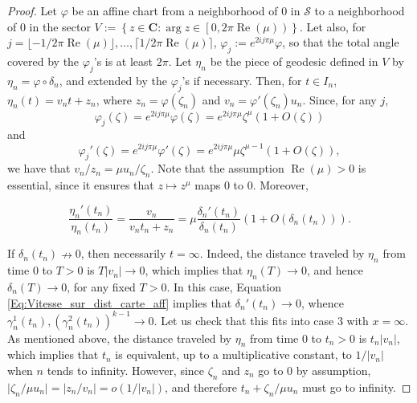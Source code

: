 \documentclass[11pt]{article}
\begin{document}
\begin{proof}
Let $\varphi$ be an affine chart from a neighborhood of $0$ in $\mathcal{S}$ to a neighborhood of $0$ in the sector $V:=\left\{z\in\mathbf{C}:\arg z\in\left[0,2\pi\operatorname{Re}(\mu)\right)\right\}$. Let also, for $j=\lfloor-1/2\pi\operatorname{Re}(\mu)\rfloor,\ldots,\lceil1/2\pi\operatorname{Re}(\mu)\rceil$, $\varphi_{j}:=e^{2ij\pi\mu}\varphi$, so that the total angle covered by the $\varphi_{j}$'s is at least $2\pi$. Let $\eta_{n}$ be the piece of geodesic defined in $V$ by $\eta_{n}=\varphi\circ\delta_{n}$, and extended by the $\varphi_{j}$'s if necessary. Then, for $t\in I_{n}$, $\eta_{n}(t)=v_{n}t+z_{n}$, where $z_{n}=\varphi(\zeta_{n})$ and $v_{n}=\varphi'(\zeta_{n})u_{n}$. Since, for any $j$,
\[
\varphi_{j}(\zeta)=e^{2ij\pi\mu}\varphi(\zeta)=e^{2ij\pi\mu}\zeta^{\mu}(1+O(\zeta))
\]
and
\[
\varphi_{j}'(\zeta)=e^{2ij\pi\mu}\varphi'(\zeta)=e^{2ij\pi\mu}\mu\zeta^{\mu-1}(1+O(\zeta)),
\]
we have that $v_{n}/z_{n}=\mu u_{n}/\zeta_{n}$. Note that the assumption $\operatorname{Re}(\mu)>0$ is essential, since it ensures that $z\mapsto z^{\mu}$ maps 0 to 0. Moreover,

\begin{equation}
    \label{Eq:Vitesse_sur_dist_carte_aff}
    \frac{\eta_{n}'(t_{n})}{\eta_{n}(t_{n})}=\frac{v_{n}}{v_{n}t_{n}+z_{n}}=\mu\frac{\delta_{n}'(t_{n})}{\delta_{n}(t_{n})}(1+O(\delta_{n}(t_{n}))).
\end{equation}

If $\delta_{n}(t_{n})\nrightarrow0$, then necessarily $t=\infty$. Indeed, the distance traveled by $\eta_{n}$ from time 0 to $T>0$ is $T\lvert v_{n}\rvert\rightarrow0$, which implies that $\eta_{n}(T)\rightarrow0$, and hence $\delta_{n}(T)\rightarrow0$, for any fixed $T>0$. In this case, Equation \ref{Eq:Vitesse_sur_dist_carte_aff} implies that $\delta_{n}'(t_{n})\rightarrow0$, whence $\gamma_{n}^{1}(t_{n}),\left(\gamma_{n}^{2}(t_{n})\right)^{k-1}\rightarrow0$. Let us check that this fits into case 3 with $x=\infty$. As mentioned above, the distance traveled by $\eta_{n}$ from time 0 to $t_{n}>0$ is $t_{n}\lvert v_{n}\rvert$, which implies that $t_{n}$ is equivalent, up to a multiplicative constant, to $1/\lvert v_{n}\rvert$ when $n$ tends to infinity. However, since $\zeta_{n}$ and $z_{n}$ go to 0 by assumption, $\lvert\zeta_{n}/\mu u_{n}\rvert=\lvert z_{n}/v_{n}\rvert=o(1/\lvert v_{n}\rvert)$, and therefore $t_{n}+\zeta_{n}/\mu u_{n}$ must go to infinity.


\end{proof}
\end{document}
